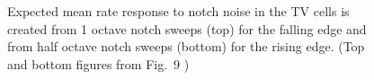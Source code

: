 \begin{figure}[htb]
  \centering {}
  \caption[TV model optimisation configuration]{Expected mean rate response to notch noise in the TV cells is created from 1 octave notch sweeps (top) for the falling edge and from half octave notch sweeps (bottom) for the rising edge. (Top and bottom figures from Fig.~9 \citep*{ReissYoung:2005})}   \label{fig:TVNotchDiagram}
\end{figure}

% 


